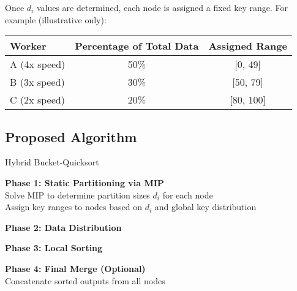 \documentclass[]{interact}
\theoremstyle{plain}
\theoremstyle{definition}
\theoremstyle{remark}
\begin{document}
Once $d_i$ values are determined, each node is assigned a fixed key range. For example (illustrative only):

\begin{center}
\begin{tabular}{l|c|c}
\textbf{Worker} & \textbf{Percentage of Total Data} & \textbf{Assigned Range} \\
\hline
A (4x speed) & 50\% & [0, 49] \\
B (3x speed) & 30\% & [50, 79] \\
C (2x speed) & 20\% & [80, 100] \\
\end{tabular}
\end{center}

\subsection{Proposed Algorithm}

\begin{algorithm}[H]
\caption{Hybrid Bucket-Quicksort}



\textbf{Phase 1: Static Partitioning via MIP} \\
Solve MIP to determine partition sizes $d_i$ for each node \\
Assign key ranges to nodes based on $d_i$ and global key distribution

\textbf{Phase 2: Data Distribution} \\

\textbf{Phase 3: Local Sorting} \\

\textbf{Phase 4: Final Merge (Optional)} \\
Concatenate sorted outputs from all nodes

\end{algorithm}
\end{document}
